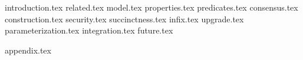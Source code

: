 {introduction.tex}
{related.tex}
{model.tex}
{properties.tex}
{predicates.tex}
{consensus.tex}
{construction.tex}
{security.tex}
{succinctness.tex}
{infix.tex}
{upgrade.tex}
{parameterization.tex}
{integration.tex}
{future.tex}

\newpage
\appendix
{appendix.tex}
